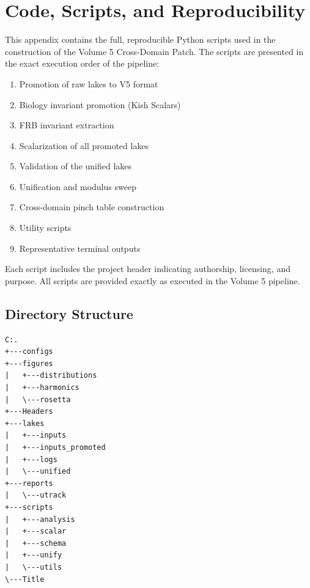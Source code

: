 \documentclass[11pt, letterpaper, openany]{book}
\begin{document}
\chapter{Code, Scripts, and Reproducibility}

This appendix contains the full, reproducible Python scripts used in the
construction of the Volume 5 Cross-Domain Patch. The scripts are presented in
the exact execution order of the pipeline:

\begin{enumerate}
    \item Promotion of raw lakes to V5 format
    \item Biology invariant promotion (Kish Scalars)
    \item FRB invariant extraction
    \item Scalarization of all promoted lakes
    \item Validation of the unified lakes
    \item Unification and modulus sweep
    \item Cross-domain pinch table construction
    \item Utility scripts
    \item Representative terminal outputs
\end{enumerate}

Each script includes the project header indicating authorship, licensing, and
purpose. All scripts are provided exactly as executed in the Volume 5 pipeline.

\section{Directory Structure}

\begin{verbatim}
C:.
+---configs
+---figures
|   +---distributions
|   +---harmonics
|   \---rosetta
+---Headers
+---lakes
|   +---inputs
|   +---inputs_promoted
|   +---logs
|   \---unified
+---reports
|   \---utrack
+---scripts
|   +---analysis
|   +---scalar
|   +---schema
|   +---unify
|   \---utils
\---Title
\end{verbatim}

\end{document}

